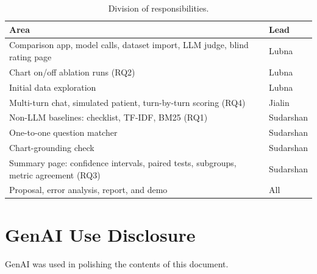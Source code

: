 \documentclass[11pt]{article}
\begin{document}
\begin{table}[!h]
\centering\small
\begin{tabularx}{\columnwidth}{@{}YL{1.55cm}@{}}
\toprule
\textbf{Area} & \textbf{Lead} \\
\midrule
Comparison app, model calls, dataset import, LLM judge, blind rating page & Lubna \\
Chart on/off ablation runs (RQ2) & Lubna \\
Initial data exploration & Lubna \\
Multi-turn chat, simulated patient, turn-by-turn scoring (RQ4) & Jialin \\
Non-LLM baselines: checklist, TF-IDF, BM25 (RQ1) & Sudarshan \\
One-to-one question matcher & Sudarshan \\
Chart-grounding check & Sudarshan \\
Summary page: confidence intervals, paired tests, subgroups, metric agreement (RQ3) & Sudarshan \\
Proposal, error analysis, report, and demo & All \\
\bottomrule
\end{tabularx}
\caption{Division of responsibilities.}
\label{tab:roles}
\end{table}

\section*{GenAI Use Disclosure}

GenAI was used in polishing the contents of this document.
\end{document}
